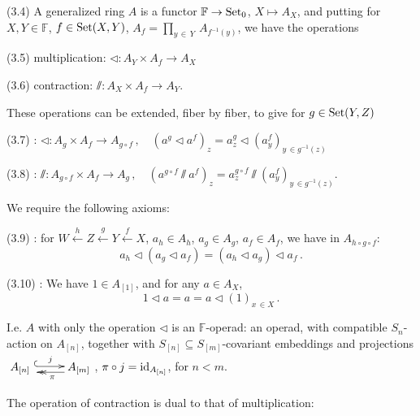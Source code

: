 \documentclass[leqno]{article}
\numberwithin{equation}{section}
\begin{document}
\noindent (3.4)  A generalized ring $A$ is a functor ${\mathbb F} \to {\rm Set}_0$, $X \mapsto A_X$, and putting for $X,Y \in {\mathbb F}$, $f \in {\rm Set} (X,Y)$, $A_f = \underset{y \, \in \, Y}{\prod} \, A_{f^{-1} (y)}$, we have the operations

\bigskip

\noindent (3.5) \quad multiplication: $ \lhd : A_Y \times A_f \to A_X$

\bigskip

\noindent (3.6) \quad contraction: $\sslash : A_X \times A_f \to A_Y$.

\bigskip

These operations can be extended, fiber by fiber, to give for $g \in {\rm Set} (Y,Z)$

\bigskip

\noindent (3.7) : $\lhd : A_g \times A_f \to A_{g \circ f} \, , \quad (a^g \lhd a^f)_z = a_z^g \lhd (a_y^f)_{y \, \in g^{-1} (z)}$

\bigskip

\noindent (3.8) : $\sslash : A_{g \circ f} \times A_f \to A_g \, , \quad (a^{g \circ f} \sslash a^f)_z = a_z^{g \circ f} \sslash (a_y^f)_{y \, \in g^{-1} (z)}$.

\bigskip

We require the following axioms:

\bigskip

\noindent (3.9) :  for $W \xleftarrow{ \ h \ } Z \xleftarrow{ \ g \ } Y \xleftarrow{ \ f \ }X$, $a_h \in A_h$, $a_g \in A_g$, $a_f \in A_f$, we have in $A_{h \circ g \circ f}$:
$$
a_h \lhd (a_g \lhd a_f) = (a_h \lhd a_g) \lhd a_f \, .
$$

\bigskip

\noindent (3.10) :  We have $1 \in A_{[1]}$, and for any $a \in A_X$,
$$
1 \lhd a = a = a \lhd (1)_{x \, \in X} \, .
$$

I.e. $A$ with only the operation $\lhd$ is an ${\mathbb F}$-operad: an operad, with compatible $S_n$-action on $A_{[n]}$, together with $S_{[n]} \subseteq S_{[m]}$-covariant embeddings and projections $\xymatrix{A_{[n]} \ \ar@{^{(}->}@<0,2ex>[r]^{j} &A_{[m]} \ar@{->>}@<1ex>[l]^{ \ \pi}}$, $\pi \circ j = {\rm id}_{A_{[n]}}$, for $n < m$. 

\smallskip

The operation of contraction is dual to that of multiplication:

\bigskip
\end{document}
